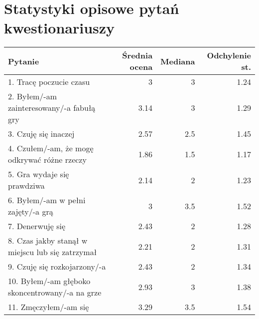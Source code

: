 \graphicspath{{appendices/imgs/}}
\chapter{Statystyki opisowe pytań kwestionariuszy}\label{appendix:B}

\begin{table}[h!]
    \begin{center}
        \begin{tabular}{|m{12em}|r|r|r|}
            \hline
            Pytanie                                                           & Średnia ocena & Mediana & Odchylenie st. \\
            \hline
            1. Tracę poczucie czasu                                           & 3             & 3       & 1.24           \\
            2. Byłem/-am \newline zainteresowany/-a fabułą gry                & 3.14          & 3       & 1.29           \\
            3. Czuję się inaczej                                              & 2.57          & 2.5     & 1.45           \\
            4. Czułem/-am, że mogę odkrywać różne rzeczy                      & 1.86          & 1.5     & 1.17           \\
            5. Gra wydaje się prawdziwa                                       & 2.14          & 2       & 1.23           \\
            6. Byłem/-am \newline w pełni zajęty/-a grą                       & 3             & 3.5     & 1.52           \\
            7. Denerwuję się                                                  & 2.43          & 2       & 1.28           \\
            8. Czas jakby stanął w miejscu lub się zatrzymał                  & 2.21          & 2       & 1.31           \\
            9. Czuję się \newline rozkojarzony/-a                             & 2.43          & 2       & 1.34           \\
            10. Byłem/-am głęboko \newline skoncentrowany/-a \newline na grze & 2.93          & 3       & 1.38           \\
            11. Zmęczyłem/-am się                                             & 3.29          & 3.5     & 1.54           \\

\end{tabular}
\end{center}
\end{table}
